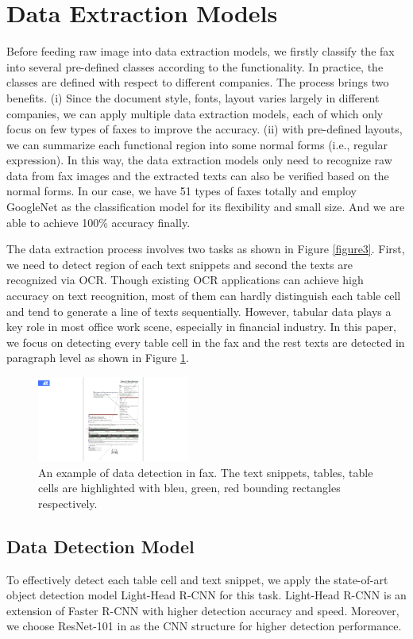 \documentclass[sigconf]{acmart}
\begin{document}
\section{Data Extraction Models}
Before feeding raw image into data extraction models, we firstly classify the fax into several pre-defined classes according to the functionality. In practice, the classes are defined with respect to different companies. The process brings two benefits. (i) Since the document style, fonts, layout varies largely in different companies, we can apply multiple data extraction models, each of which only focus on few types of faxes to improve the accuracy. (ii) with pre-defined layouts, we can summarize each functional region into some normal forms (i.e., regular expression). In this way, the data extraction models only need to recognize raw data from fax images and the extracted texts can also be verified based on the normal forms. In our case, we have 51 types of faxes totally and employ GoogleNet \cite{szegedy2015going} as the classification model for its flexibility and small size. And we are able to achieve 100\% accuracy finally.

The data extraction process involves two tasks as shown in Figure \ref{figure3}. First, we need to detect region of each text snippets and second the texts are recognized via OCR. Though existing OCR applications can achieve high accuracy on text recognition, most of them can hardly distinguish each table cell and tend to generate a line of texts sequentially. However, tabular data plays a key role in most office work scene, especially in financial industry. In this paper, we focus on detecting every table cell in the fax and the rest texts are detected in paragraph level as shown in Figure \ref{figure5}.


\begin{figure}[h]
	\centering
	\includegraphics[width=5cm]{figure5}
	\caption{An example of data detection in fax. The text snippets, tables, table cells are highlighted with bleu, green, red bounding rectangles respectively. }
	\label{figure5}
\end{figure}

\subsection{Data Detection Model}
To effectively detect each table cell and text snippet, we apply the state-of-art object detection model Light-Head R-CNN \cite{li2017light} for this task. Light-Head R-CNN is an extension of Faster R-CNN with higher detection accuracy and speed. Moreover, we choose ResNet-101 in \cite{he2016deep} as the CNN structure for higher detection performance.
\end{document}
